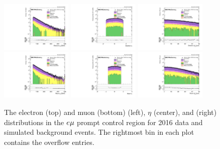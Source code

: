 \begin{figure}
\centering
\includegraphics[width=0.3\textwidth]{figures/selection/pcr_emu_2016/electronPt.pdf}
\includegraphics[width=0.3\textwidth]{figures/selection/pcr_emu_2016/electronEta.pdf}
\includegraphics[width=0.3\textwidth]{figures/selection/pcr_emu_2016/electronAbsD0_50um.pdf}
\includegraphics[width=0.3\textwidth]{figures/selection/pcr_emu_2016/muonPt.pdf}
\includegraphics[width=0.3\textwidth]{figures/selection/pcr_emu_2016/muonEta.pdf}
\includegraphics[width=0.3\textwidth]{figures/selection/pcr_emu_2016/muonAbsD0_50um.pdf}
\caption{The electron (top) and muon (bottom) \pt (left), $\eta$ (center), and \ad (right) distributions in the $e{\mu}$ prompt control region for 2016 data and simulated background events. The rightmost bin in each plot contains the overflow entries.}
\label{pcr_emu_2016}
\end{figure}